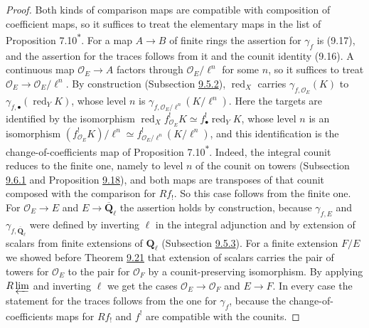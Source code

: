 \documentclass[11pt]{article}
\newcommand{\bpout}[1]{#1\textsuperscript{\hyperlink{bp-outside}{\ensuremath{\ast}}}}
\begin{document}
\begin{proof}[{Proof}]\label{bp91}%
Both kinds of comparison maps are compatible with composition of coefficient maps, so it suffices to treat the elementary maps in the list of Proposition \bpout{7.10}. For a map \(A\to B\) of finite rings the assertion for \(\gamma_f\) is (9.17), and the assertion for the traces follows from it and the counit identity (9.16). A continuous map \(\mathcal O_E\to A\) factors through \(\mathcal O_E/\ell^n\) for some \(n\), so it suffices to treat \(\mathcal O_E\to\mathcal O_E/\ell^n\). By construction (Subsection \hyperref[bp50]{9.5.2}), \(\operatorname{red}_X\) carries \(\gamma_{f,\mathcal O_E}(K)\) to \(\gamma_{f,\bullet}(\operatorname{red}_YK)\), whose level \(n\) is \(\gamma_{f,\mathcal O_E/\ell^n}(K/\ell^n)\). Here the targets are identified by the isomorphism \(\operatorname{red}_Xf^!_{\mathcal O_E}K\simeq f^!_\bullet\operatorname{red}_YK\), whose level \(n\) is an isomorphism \((f^!_{\mathcal O_E}K)/\ell^n\simeq f^!_{\mathcal O_E/\ell^n}(K/\ell^n)\), and this identification is the change-of-coefficients map of Proposition \bpout{7.10}. Indeed, the integral counit reduces to the finite one, namely to level \(n\) of the counit on towers (Subsection \hyperref[bp74]{9.6.1} and Proposition \hyperref[bp58]{9.18}), and both maps are transposes of that counit composed with the comparison for \(Rf_!\). So this case follows from the finite one. For \(\mathcal O_E\to E\) and \(E\to\overline{\mathbf Q}_\ell\) the assertion holds by construction, because \(\gamma_{f,E}\) and \(\gamma_{f,\overline{\mathbf Q}_\ell}\) were defined by inverting \(\ell\) in the integral adjunction and by extension of scalars from finite extensions of \(\mathbf Q_\ell\) (Subsection \hyperref[bp64]{9.5.3}). For a finite extension \(F/E\) we showed before Theorem \hyperref[bp69]{9.21} that extension of scalars carries the pair of towers for \(\mathcal O_E\) to the pair for \(\mathcal O_F\) by a counit-preserving isomorphism. By applying \(R\varprojlim\) and inverting \(\ell\) we get the cases \(\mathcal O_E\to\mathcal O_F\) and \(E\to F\). In every case the statement for the traces follows from the one for \(\gamma_f\), because the change-of-coefficients maps for \(Rf_!\) and \(f^!\) are compatible with the counits.
\end{proof}



\end{document}
